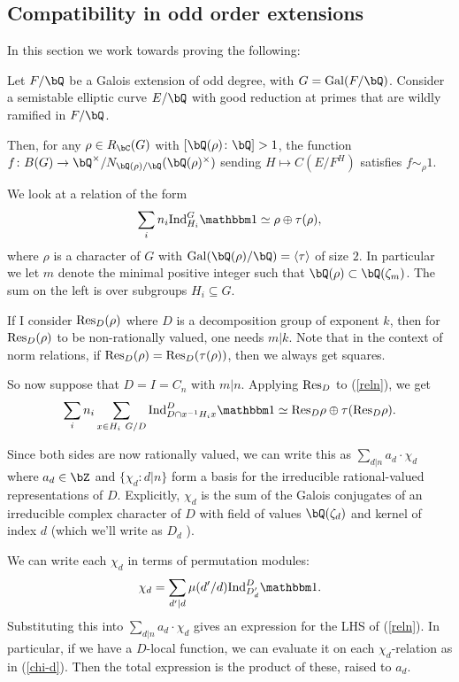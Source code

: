 \subsection{Compatibility in odd order extensions}

In this section we work towards proving the following:

\begin{thm}
    Let $F / \bQ$ be a Galois extension of odd degree, with $G = \Gal(F / \bQ)$. 
    Consider a semistable elliptic curve $E / \bQ$ with good reduction at primes that are wildly ramified in $F / \bQ$.
    
    Then, for any $\rho \in R_{\bC}(G)$ with $[\bQ(\rho)\colon \bQ] > 1$, the function $f \colon B(G) \to
    \bQ^{\times} / N_{\bQ(\rho) / \bQ}(\bQ(\rho)^{\times})$ sending $H \mapsto C(E / F^{H})$ satisfies $f \sim_{\rho} 1$.
\end{thm}

We look at a relation of the form
\begin{equation}\label{reln} 
    \sum_i n_i \Ind_{H_i}^G \trivial \simeq \rho \oplus \tau(\rho),
\end{equation}
where $\rho$ is a character of $G$ with $\Gal(\bQ(\rho) / \bQ) = \langle \tau \rangle $ of size $2$. In particular we let $m$ denote the minimal positive integer such that $\bQ(\rho) \subset \bQ(\zeta_m)$. The sum on the left is over subgroups $H_i \subseteq G$. 

If I consider $\mathrm{Res}_D(\rho)$ where $D$ is a decomposition group of exponent $k$, then for $\mathrm{Res}_D(\rho)$ to be non-rationally valued, one needs $m |k$. Note that in the context of norm relations, if $\mathrm{Res}_D(\rho) = \mathrm{Res}_D(\tau(\rho))$, then we always get squares.

So now suppose that $D = I = C_n$ with $m | n$. Applying $\mathrm{Res}_D$ to (\ref{reln}), we get
\begin{equation}\label{reln-resD}
\sum_i n_i \sum_{x \in H_i \ G / D} \Ind_{D \cap x^{-1}H_i x}^D \trivial \simeq \Res_D \rho \oplus \tau(\Res_D \rho).
\end{equation}

Since both sides are now rationally valued, we can write this as $\sum_{d |n} a_d \cdot \chi_d$ where $a_d \in \bZ$ and $\{ \chi_d \colon d|n \}$ form a basis for the irreducible rational-valued representations of $D$. Explicitly, $\chi_d$ is the sum of the Galois conjugates of an irreducible complex character of $D$ with field of values $\bQ(\zeta_d)$ and kernel of index $d$ (which we'll write as $D_d$ ).

We can write each $\chi_d$ in terms of permutation modules:
\begin{equation}\label{chi-d} \chi_d = \sum_{d' | d} \mu(d' / d)\Ind_{D_d'}^D \trivial .\end{equation}
Substituting this into  $\sum_{d |n} a_d \cdot \chi_d$ gives an expression for the LHS of (\ref{reln}).
In particular, if we have a $D$-local function, we can evaluate it on each $\chi_d$-relation as in (\ref{chi-d}). Then the total expression is the product of these, raised to $a_d$.